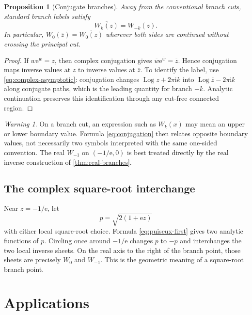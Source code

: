 \documentclass[11pt]{article}
\numberwithin{equation}{section}
\newtheorem{proposition}[theorem]{Proposition}
\theoremstyle{definition}
\theoremstyle{remark}
\newtheorem{warning}[theorem]{Warning}
\newcommand{\e}{\mathrm e}
\newcommand{\ii}{\mathrm i}
\newcommand{\Log}{\operatorname{Log}}
\begin{document}
\begin{proposition}[Conjugate branches]
\label{prop:conjugation}
Away from the conventional branch cuts, standard branch labels satisfy
\begin{equation}
  \overline{W_k(z)}=W_{-k}(\overline z).               \label{eq:conjugation}
\end{equation}
In particular, $W_0(\overline z)=\overline{W_0(z)}$ wherever both sides are
continued without crossing the principal cut.
\end{proposition}

\begin{proof}
If $w\e^w=z$, then complex conjugation gives
$\overline w\e^{\overline w}=\overline z$.  Hence conjugation maps inverse
values at $z$ to inverse values at $\overline z$.  To identify the label, use
\eqref{eq:complex-asymptotic}: conjugation changes
$\Log z+2\pi\ii k$ into
$\Log\overline z-2\pi\ii k$ along conjugate paths, which is the leading
quantity for branch $-k$.  Analytic continuation preserves this identification
through any cut-free connected region.
\end{proof}

\begin{warning}
On a branch cut, an expression such as $W_k(x)$ may mean an upper or lower
boundary value.  Formula \eqref{eq:conjugation} then relates opposite boundary
values, not necessarily two symbols interpreted with the same one-sided
convention.  The real $W_{-1}$ on $(-1/\e,0)$ is best treated directly by the
real inverse construction of \cref{thm:real-branches}.
\end{warning}

\subsection{The complex square-root interchange}

Near $z=-1/\e$, let
\[
 p=\sqrt{2(1+\e z)}
\]
with either local square-root choice.  Formula \eqref{eq:puiseux-first} gives
two analytic functions of $p$.  Circling once around $-1/\e$ changes $p$ to
$-p$ and interchanges the two local inverse sheets.  On the real axis to the
right of the branch point, those sheets are precisely $W_0$ and $W_{-1}$.
This is the geometric meaning of a square-root branch point.

\section{Applications}
\label{sec:applications}
\end{document}
